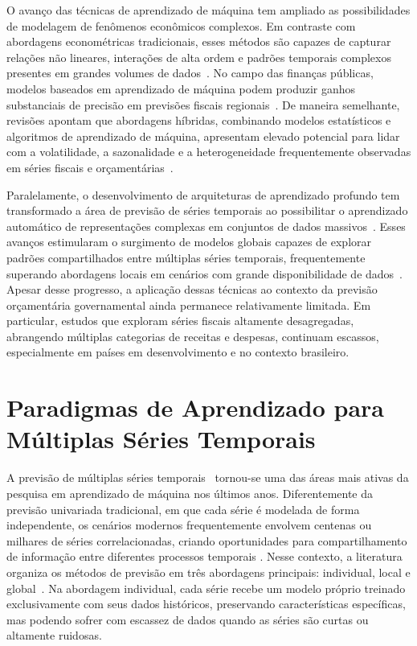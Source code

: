 \documentclass[12pt]{article}
\begin{document}
O avanço das técnicas de aprendizado de máquina tem ampliado as possibilidades de modelagem de fenômenos econômicos complexos. Em contraste com abordagens econométricas tradicionais, esses métodos são capazes de capturar relações não lineares, interações de alta ordem e padrões temporais complexos presentes em grandes volumes de dados~\cite{duarte2025improving}. No campo das finanças públicas, modelos baseados em aprendizado de máquina podem produzir ganhos substanciais de precisão em previsões fiscais regionais~\cite{Batog2021}. De maneira semelhante, revisões apontam que abordagens híbridas, combinando modelos estatísticos e algoritmos de aprendizado de máquina, apresentam elevado potencial para lidar com a volatilidade, a sazonalidade e a heterogeneidade frequentemente observadas em séries fiscais e orçamentárias~\cite{masini2023machine}.

Paralelamente, o desenvolvimento de arquiteturas de aprendizado profundo tem transformado a área de previsão de séries temporais ao possibilitar o aprendizado automático de representações complexas em conjuntos de dados massivos~\cite{ansari2024chronos}. Esses avanços estimularam o surgimento de modelos globais capazes de explorar padrões compartilhados entre múltiplas séries temporais, frequentemente superando abordagens locais em cenários com grande disponibilidade de dados~\cite{masini2023machine,ansari2024chronos}. Apesar desse progresso, a aplicação dessas técnicas ao contexto da previsão orçamentária governamental ainda permanece relativamente limitada. Em particular, estudos que exploram séries fiscais altamente desagregadas, abrangendo múltiplas categorias de receitas e despesas, continuam escassos, especialmente em países em desenvolvimento e no contexto brasileiro.


\section{Paradigmas de Aprendizado para Múltiplas Séries Temporais}
\label{sec:paradigmas}

A previsão de múltiplas séries temporais~\cite{makridakis2018m4, makridakis2022m5,aksu2024gift} tornou-se uma das áreas mais ativas da pesquisa em aprendizado de máquina nos últimos anos. Diferentemente da previsão univariada tradicional, em que cada série é modelada de forma independente, os cenários modernos frequentemente envolvem centenas ou milhares de séries correlacionadas, criando oportunidades para compartilhamento de informação entre diferentes processos temporais \cite{montero2021principles}. Nesse contexto, a literatura organiza os métodos de previsão em três abordagens principais: individual, local e global~\cite{montero2021principles, bandara2020forecasting}. Na abordagem individual, cada série recebe um modelo próprio treinado exclusivamente com seus dados históricos, preservando características específicas, mas podendo sofrer com escassez de dados quando as séries são curtas ou altamente ruidosas.
\end{document}
